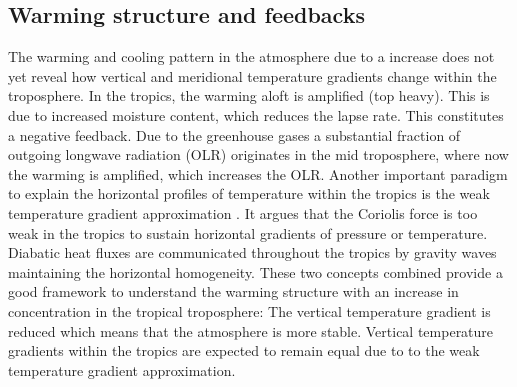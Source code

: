 \subsection{Warming structure and feedbacks}
The warming and cooling pattern in the atmosphere due to a \CO{} increase does not yet reveal how vertical and meridional temperature gradients change within the troposphere. In the tropics, the warming aloft is amplified (top heavy). This is due to increased moisture content, which reduces the lapse rate. This constitutes a negative feedback. Due to the greenhouse gases a substantial fraction of outgoing longwave radiation (OLR) originates in the mid troposphere, where now the warming is amplified, which increases the OLR. Another important paradigm to explain the horizontal profiles of temperature within the tropics is the weak temperature gradient approximation \parencite{sobelWeakTemperatureGradient2001}. It argues that the Coriolis force is too weak in the tropics to sustain horizontal gradients of pressure or temperature. Diabatic heat fluxes are communicated throughout the tropics by gravity waves maintaining the horizontal homogeneity. These two concepts combined provide a good framework to understand the warming structure with an increase in \CO{} concentration in the tropical troposphere: The vertical temperature gradient is reduced which means that the atmosphere is more stable. Vertical temperature gradients within the tropics are expected to remain equal due to to the weak temperature gradient approximation.


